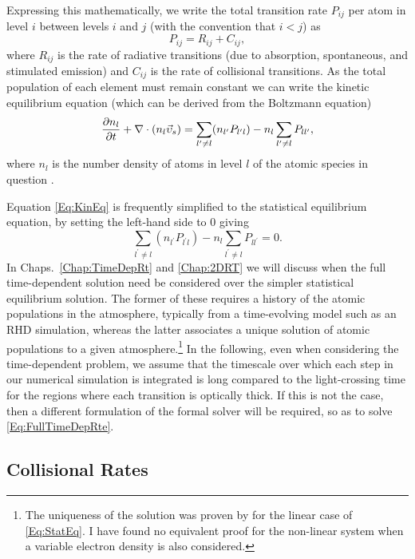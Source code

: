 Expressing this mathematically, we write the total transition rate $P_{ij}$ per atom in level $i$ between levels $i$ and $j$ (with the convention that $i < j$) as
\begin{equation}
    P_{ij} = R_{ij} + C_{ij},
\end{equation}
where $R_{ij}$ is the rate of radiative transitions (due to absorption, spontaneous, and stimulated emission) and $C_{ij}$ is the rate of collisional transitions.
As the total population of each element must remain constant we can write the kinetic equilibrium equation (which can be derived from the Boltzmann equation)
\begin{equation}
    \frac{\partial n_l}{\partial t} + \nabla \cdot (n_l \vec{\upsilon}_s) = \sum_{l^\prime\neq l} (n_{l^\prime} P_{l^\prime l}) - n_l \sum_{l^\prime\neq l} P_{ll^\prime},
    \label{Eq:KinEq}
\end{equation}
where $n_l$ is the number density of atoms in level $l$ of the atomic species in question .

Equation \eqref{Eq:KinEq} is frequently simplified to the statistical equilibrium equation, by setting the left-hand side to 0 giving
\begin{equation}
\sum_{l^\prime\neq l} (n_{l^\prime} P_{l^\prime l}) - n_l \sum_{l^\prime\neq l} P_{ll^\prime} = 0.
\label{Eq:StatEq}
\end{equation}
In Chaps.~\ref{Chap:TimeDepRt} and \ref{Chap:2DRT} we will discuss when the full time-dependent solution need be considered over the simpler statistical equilibrium solution.
The former of these requires a history of the atomic populations in the atmosphere, typically from a time-evolving model such as an RHD simulation, whereas the latter associates a unique solution of atomic populations to a given atmosphere.\footnote{The uniqueness of the solution was proven by \citet{Rybicki1997} for the linear case of \eqref{Eq:StatEq}. I have found no equivalent proof for the non-linear system when a variable electron density is also considered.}
In the following, even when considering the time-dependent problem, we assume that the timescale over which each step in our numerical simulation is integrated is long compared to the light-crossing time for the regions where each transition is optically thick.
If this is not the case, then a different formulation of the formal solver will be required, so as to solve \eqref{Eq:FullTimeDepRte}.

\subsection{Collisional Rates}

